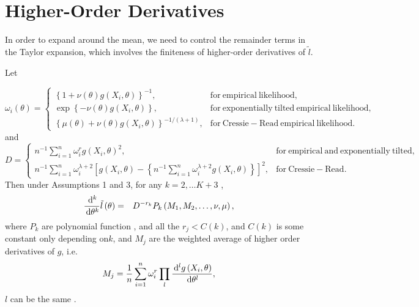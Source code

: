 \section{Higher-Order Derivatives}\label{app:high-order-der}

In order to expand around the mean, we need to control the
remainder terms in the Taylor expansion, which involves the finiteness of higher-order
derivatives of $\tilde{l}$. 
\begin{lemma}
\label{lem:control-higher-order-derivative-l}Let%
\begin{comment}
this lemma need change
\end{comment}
{} 
\[
\omega_{i}\left(\theta\right)=\begin{cases}
\left\{ 1+\nu\left(\theta\right)g\left(X_{i},\theta\right)\right\} ^{-1}, & \mathrm{for\: empirical\: likelihood,}\\
\exp\left\{ -\nu\left(\theta\right)g\left(X_{i},\theta\right)\right\} , & \mathrm{for\: exponentially\: tilted\: empirical\: likelihood,}\\
\left\{ \mu\left(\theta\right)+\nu\left(\theta\right)g\left(X_{i},\theta\right)\right\} ^{-1/\left(\lambda+1\right)}, & \mathrm{for\: Cressie-Read\: empirical\: likelihood.}
\end{cases}
\]
and 
\[
D=\begin{cases}
n^{-1}\sum_{i=1}^{n}\omega_{i}^{r}g\left(X_{i},\theta\right)^{2}, & \mathrm{for\: empirical\: and\: exponentially\:tilted,}\\
n^{-1}\sum_{i=1}^{n}\omega_{i}^{\lambda+2}\left[g\left(X_{i},\theta\right)-\left\{ n^{-1}\sum_{i=1}^{n}\omega_{i}^{\lambda+2}g\left(X_{i},\theta\right)\right\} \right]^{2}, & \mathrm{for\: Cressie-Read.}
\end{cases}
\]
Then  under Assumptions 1 and 3, for any $k=2,\ldots K+3$ , 
\begin{eqnarray*}
\frac{\,\mathrm{d}^{k}}{\,\mathrm{d}\theta^{k}}\tilde{l}\left(\theta\right) & = & D^{-r_{k}}P_{k}\left(M_{1},M_{2},\ldots,\nu,\mu\right),
\end{eqnarray*}
where $P_{k}$ are polynomial function , and all the $r_{j}<C\left(k\right)$,
and $C\left(k\right)$ is some constant only depending on$k$, and
$M_{j}$ are the weighted average of higher order derivatives of $g$,
i.e. 
\[
M_{j}=\frac{1}{n}\sum_{i=1}^{n}\omega_{i}^{r}\prod_{l}\frac{\,\mathrm{d}^{l}g\left(X_{i},\theta\right)}{\,\mathrm{d}\theta^{l}},
\]
$l$ can be the same . \end{lemma}
